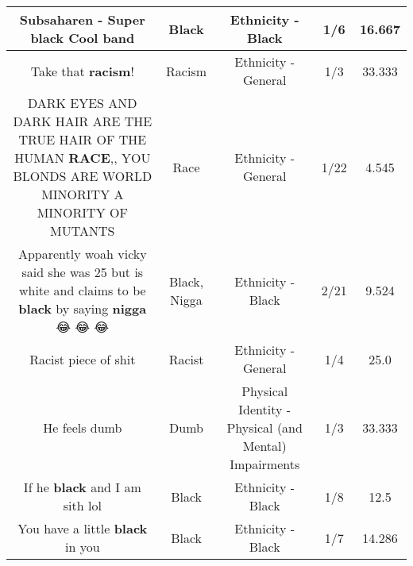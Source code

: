 \documentclass[11pt]{article}
\newlength\mylength
\begin{document}
\begin{center}
\begin{longtable}{|C{.65\mylength}|C{.30\mylength}|C{.12\mylength}|C{.12\mylength}|C{.12\mylength}|}
  \small Subsaharen - Super \textbf{black} Cool band\normalsize   & Black & Ethnicity - Black & 1/6 & 16.667 \\  \hline
  \small Take that \textbf{racism}!\normalsize   & Racism & Ethnicity - General & 1/3 & 33.333 \\  \hline
  \small DARK EYES AND DARK HAIR ARE THE TRUE HAIR OF THE HUMAN \textbf{RACE},, YOU BLONDS ARE WORLD MINORITY A MINORITY OF MUTANTS\normalsize   & Race & Ethnicity - General & 1/22 & 4.545 \\  \hline
  \small Apparently woah vicky said she was 25 but is white and claims to be \textbf{black} by saying \textbf{nigga} 😂 😂 😂\normalsize   & Black, Nigga & Ethnicity - Black & 2/21 & 9.524 \\  \hline
  \small Racist piece of shit\normalsize   & Racist & Ethnicity - General & 1/4 & 25.0 \\  \hline
  \small He feels dumb\normalsize   & Dumb & Physical Identity - Physical (and Mental) Impairments & 1/3 & 33.333 \\  \hline
  \small If he \textbf{black} and I am sith lol\normalsize   & Black & Ethnicity - Black & 1/8 & 12.5 \\  \hline
  \small You have a little \textbf{black} in you\normalsize   & Black & Ethnicity - Black & 1/7 & 14.286 \\  \hline

\end{longtable}
\end{center}
\end{document}
